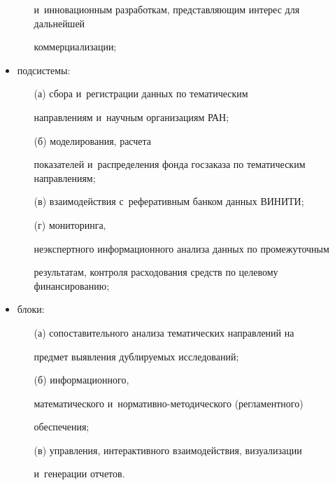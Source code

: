 \begin{multicols}{2}
\begin{itemize}
\begin{itemize}
и~инновационным разработкам, пред\-став\-ля\-ющим интерес для дальнейшей 

коммерциализации;

\end{itemize}

    \item  подсистемы: 

    \begin{itemize}

    \item[(а)] сбора и~регистрации данных по тематическим 

на\-прав\-ле\-ни\-ям и~научным организациям РАН; 

\item[(б)] моделирования, расчета 

показателей и~распределения фонда госзаказа по тематическим на\-прав\-ле\-ни\-ям; 

\item[(в)] взаимодействия с~реферативным банком данных \mbox{ВИНИТИ}; 

\item[(г)] мониторинга, 

неэкспертного информационного анализа данных по промежуточным 

результатам, контроля расходования средств по целевому финансированию;

\end{itemize}

\item  блоки: 

\begin{itemize}

\item[(а)] сопоставительного анализа тематических на\-прав\-ле\-ний на 

предмет выявления дублируемых исследований;

\item[(б)] информационного, 

математического и~нор\-ма\-тив\-но-ме\-то\-ди\-че\-ско\-го (регламентного) 

обеспечения; 

\item[(в)] управ\-ле\-ния, интерактивного взаимодействия, визуализации 

и~генерации отчетов. 

\end{itemize}

\end{itemize}


\end{multicols}
